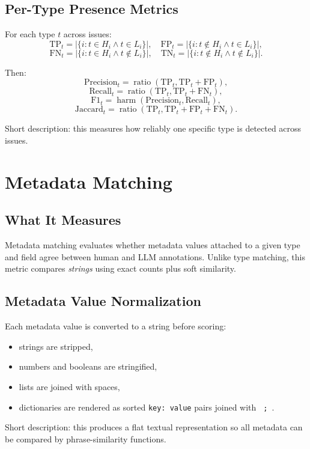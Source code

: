 \documentclass[11pt]{article}
\begin{document}
\subsection{Per-Type Presence Metrics}
For each type $t$ across issues:
\[
\mathrm{TP}_t = |\{i: t \in H_i \land t \in L_i\}|,
\quad
\mathrm{FP}_t = |\{i: t \notin H_i \land t \in L_i\}|,
\]
\[
\mathrm{FN}_t = |\{i: t \in H_i \land t \notin L_i\}|,
\quad
\mathrm{TN}_t = |\{i: t \notin H_i \land t \notin L_i\}|.
\]

Then:
\[
\mathrm{Precision}_t = \operatorname{ratio}(\mathrm{TP}_t,\mathrm{TP}_t+\mathrm{FP}_t),
\]
\[
\mathrm{Recall}_t = \operatorname{ratio}(\mathrm{TP}_t,\mathrm{TP}_t+\mathrm{FN}_t),
\]
\[
\mathrm{F1}_t = \operatorname{harm}(\mathrm{Precision}_t,\mathrm{Recall}_t),
\]
\[
\mathrm{Jaccard}_t = \operatorname{ratio}(\mathrm{TP}_t,\mathrm{TP}_t+\mathrm{FP}_t+\mathrm{FN}_t).
\]

Short description: this measures how reliably one specific type is detected across issues.

\section{Metadata Matching}
\subsection{What It Measures}
Metadata matching evaluates whether metadata values attached to a given type and field agree between human and LLM annotations. Unlike type matching, this metric compares \emph{strings} using exact counts plus soft similarity.

\subsection{Metadata Value Normalization}
Each metadata value is converted to a string before scoring:
\begin{itemize}[leftmargin=*]
\item strings are stripped,
\item numbers and booleans are stringified,
\item lists are joined with spaces,
\item dictionaries are rendered as sorted \texttt{key: value} pairs joined with \texttt{ ; }.
\end{itemize}

Short description: this produces a flat textual representation so all metadata can be compared by phrase-similarity functions.
\end{document}
